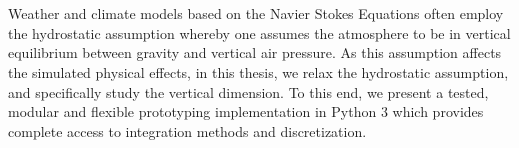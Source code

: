 \chapter{\abstractname}
Weather and climate models based on the Navier Stokes Equations often employ the hydrostatic assumption whereby one assumes the atmosphere to be in vertical equilibrium between gravity and vertical air pressure.
As this assumption affects the simulated physical effects, in this thesis, we relax the hydrostatic assumption, and specifically study the vertical dimension.
To this end, we present a tested, modular and flexible prototyping implementation in Python 3 which provides complete access to integration methods and discretization.
